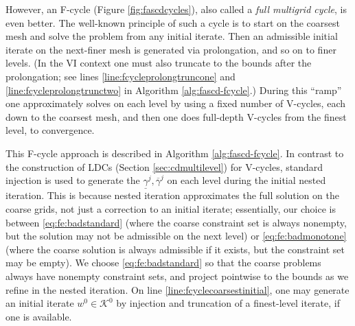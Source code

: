 \documentclass[review,hidelinks,onefignum,onetabnum]{siamart220329}
\newcommand{\elb}[1]{\todo[inline, color=blue!20]{EB: #1}}
\begin{document}
\elb{add \id{stol}}

However, an F-cycle (Figure \ref{fig:fascdcycles}), also called a \emph{full multigrid cycle}, is even better.  The well-known principle of such a cycle \cite[section 2.6]{Trottenbergetal2001} is to start on the coarsest mesh and solve the problem from any initial iterate.  Then an admissible initial iterate on the next-finer mesh is generated via prolongation, and so on to finer levels.  (In the VI context one must also truncate to the bounds after the prolongation; see lines \ref{line:fcycleprolongtruncone} and \ref{line:fcycleprolongtrunctwo} in Algorithm \ref{alg:fascd-fcycle}.)  During this ``ramp'' one approximately solves on each level by using a fixed number of V-cycles, each down to the coarsest mesh, and then one does full-depth V-cycles from the finest level, to convergence.

This F-cycle approach is described in Algorithm \ref{alg:fascd-fcycle}.  In contrast to the construction of LDCs (Section \ref{sec:cdmultilevel}) for V-cycles, standard injection is used to generate the $\underline{\gamma}^j,\overline{\gamma}^j$ on each level during the initial nested iteration. This is because nested iteration approximates the full solution on the coarse grids, not just a correction to an initial iterate; essentially, our choice is between \eqref{eq:fe:badstandard} (where the coarse constraint set is always nonempty, but the solution may not be admissible on the next level) or \eqref{eq:fe:badmonotone} (where the coarse solution is always admissible if it exists, but the constraint set may be empty). We choose \eqref{eq:fe:badstandard} so that the coarse problems always have nonempty constraint sets, and project pointwise to the bounds as we refine in the nested iteration.
On line \ref{line:fcyclecoarsestinitial}, one may generate an initial iterate $w^0\in\mathcal{K}^0$ by injection and truncation of a finest-level iterate, if one is available.
\end{document}
